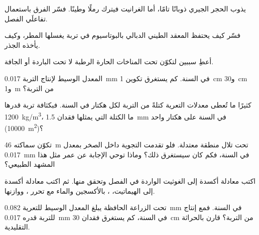 \begin{exercise}[$\star\star$]\label{exo:g10:soil-formation:7}
يذوب الحجر الجيري ذوبانًا تامًا، أما الغرانيت فيترك رملًا وطينًا. فسّر الفرق
باستعمال تفاعلَي الفصل.
\end{exercise}

\begin{exercise}[$\star\star$]\label{exo:g10:soil-formation:8}
فسّر كيف يحتفظ المعقد الطيني الدبالي بالبوتاسيوم في تربة يغسلها المطر، وكيف يأخذه
الجذر.
\end{exercise}

\begin{exercise}[$\star\star$]\label{exo:g10:soil-formation:9}
أعطِ سببين لتكوّن  تحت المناخات الحارة الرطبة لا تحت الباردة
أو الجافة.
\end{exercise}

\begin{exercise}[$\star\star$]\label{exo:g10:soil-formation:10}
المعدل الوسيط لإنتاج التربة \qty{0.017}{mm} في السنة. كم يستغرق تكوين
\qty{1}{cm} و\qty{30}{cm} و\qty{1}{m} من التربة؟
\end{exercise}

\begin{exercise}[$\star\star$]\label{exo:g10:soil-formation:11}
كثيرًا ما تُعطى معدلات التعرية كتلةً من التربة لكل هكتار في السنة. فبكثافة تربة
قدرها \qty{1200}{kg/m^3}، ما الكتلة التي يمثلها فقدان
\qty{1.5}{mm} في السنة على هكتار واحد (\qty{10000}{m^2})؟
\end{exercise}

\begin{exercise}[$\star\star\star$]\label{exo:g10:soil-formation:12}
تكوّن  سماكته \qty{46}{m} تحت تلال منطقة معتدلة. فلو تقدمت التجوية
داخل الصخر بمعدل \qty{0.017}{mm} في السنة، فكم كان سيستغرق ذلك؟ وماذا توحي
الإجابة عن عمر مثل هذا
المشهد الطبيعي؟
\end{exercise}

\begin{exercise}[$\star\star\star$]\label{exo:g10:soil-formation:13}
اكتب معادلة أكسدة  إلى الغوثيت الواردة في
الفصل وتحقق منها. ثم اكتب معادلة أكسدة  إلى
الهيماتيت، ، بالأكسجين والماء مع تحرر ، ووازنها.
\end{exercise}

\begin{exercise}[$\star\star\star$]\label{exo:g10:soil-formation:14}
تحت الزراعة الحافظة يبلغ المعدل الوسيط للتعرية \qty{0.082}{mm} في
السنة. فمع إنتاج للتربة قدره \qty{0.017}{mm} في السنة، كم يستغرق
فقدان \qty{30}{cm} من التربة؟ قارن بالحراثة التقليدية.
\end{exercise}

